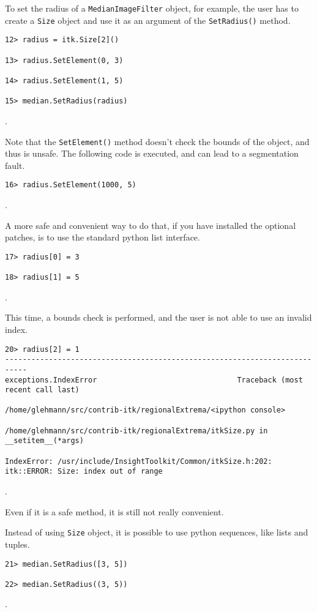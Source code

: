 \documentclass{InsightArticle}
\begin{document}
To set the radius of a \verb$MedianImageFilter$ object, for example, the user has to
create a \verb$Size$ object and use it as an argument of the \verb$SetRadius()$ method.
\begin{verbatim}
12> radius = itk.Size[2]()

13> radius.SetElement(0, 3)

14> radius.SetElement(1, 5)

15> median.SetRadius(radius)
\end{verbatim}.

Note that the \verb$SetElement()$ method doesn't check the bounds of the object, and thus
is unsafe. The following code is executed, and can lead to a segmentation fault.

\begin{verbatim}
16> radius.SetElement(1000, 5)
\end{verbatim}.

A more safe and convenient way to do that, if you have installed the optional patches,
is to use the standard python list interface.

\begin{verbatim}
17> radius[0] = 3

18> radius[1] = 5
\end{verbatim}.

This time, a bounds check is performed, and the user is not able to use an invalid index.

\begin{verbatim}
20> radius[2] = 1
---------------------------------------------------------------------------
exceptions.IndexError                                Traceback (most recent call last)

/home/glehmann/src/contrib-itk/regionalExtrema/<ipython console>

/home/glehmann/src/contrib-itk/regionalExtrema/itkSize.py in __setitem__(*args)

IndexError: /usr/include/InsightToolkit/Common/itkSize.h:202:
itk::ERROR: Size: index out of range
\end{verbatim}.

Even if it is a safe method, it is still not really convenient.

Instead of using \verb$Size$ object, it is possible to use python sequences, like lists
and tuples.

\begin{verbatim}
21> median.SetRadius([3, 5])

22> median.SetRadius((3, 5))
\end{verbatim}.
\end{document}
